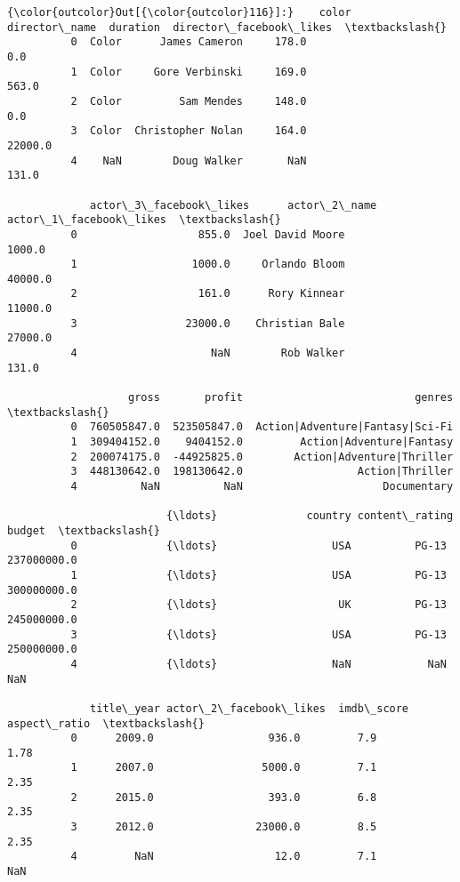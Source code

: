 \documentclass[11pt]{article}
\begin{document}
\begin{Verbatim}[commandchars=\\\{\}]
{\color{outcolor}Out[{\color{outcolor}116}]:}    color      director\_name  duration  director\_facebook\_likes  \textbackslash{}
          0  Color      James Cameron     178.0                      0.0   
          1  Color     Gore Verbinski     169.0                    563.0   
          2  Color         Sam Mendes     148.0                      0.0   
          3  Color  Christopher Nolan     164.0                  22000.0   
          4    NaN        Doug Walker       NaN                    131.0   
          
             actor\_3\_facebook\_likes      actor\_2\_name  actor\_1\_facebook\_likes  \textbackslash{}
          0                   855.0  Joel David Moore                  1000.0   
          1                  1000.0     Orlando Bloom                 40000.0   
          2                   161.0      Rory Kinnear                 11000.0   
          3                 23000.0    Christian Bale                 27000.0   
          4                     NaN        Rob Walker                   131.0   
          
                   gross       profit                           genres  \textbackslash{}
          0  760505847.0  523505847.0  Action|Adventure|Fantasy|Sci-Fi   
          1  309404152.0    9404152.0         Action|Adventure|Fantasy   
          2  200074175.0  -44925825.0        Action|Adventure|Thriller   
          3  448130642.0  198130642.0                  Action|Thriller   
          4          NaN          NaN                      Documentary   
          
                         {\ldots}              country content\_rating       budget  \textbackslash{}
          0              {\ldots}                  USA          PG-13  237000000.0   
          1              {\ldots}                  USA          PG-13  300000000.0   
          2              {\ldots}                   UK          PG-13  245000000.0   
          3              {\ldots}                  USA          PG-13  250000000.0   
          4              {\ldots}                  NaN            NaN          NaN   
          
             title\_year actor\_2\_facebook\_likes  imdb\_score aspect\_ratio  \textbackslash{}
          0      2009.0                  936.0         7.9         1.78   
          1      2007.0                 5000.0         7.1         2.35   
          2      2015.0                  393.0         6.8         2.35   
          3      2012.0                23000.0         8.5         2.35   
          4         NaN                   12.0         7.1          NaN   
          

\end{Verbatim}
\end{document}
